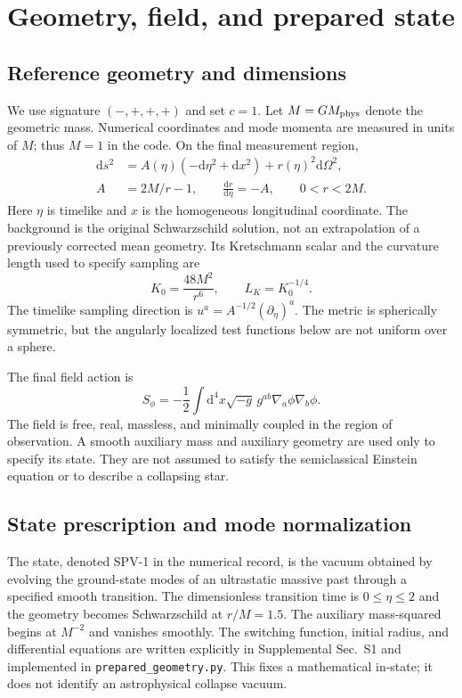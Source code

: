 \documentclass[aps,prd,reprint,floatfix,nofootinbib,longbibliography]{revtex4-2}
\newcommand{\dd}{\mathrm{d}}
\newcommand{\Lc}{L_{\!K}}
\begin{document}
\section{Geometry, field, and prepared state}
\subsection{Reference geometry and dimensions}
We use signature $(-,+,+,+)$ and set $c=1$. Let $M=G M_{\rm phys}$ denote the geometric mass. Numerical coordinates and mode momenta are measured in units of $M$; thus $M=1$ in the code. On the final measurement region,
\begin{align}
 \dd s^2&=A(\eta)(-\dd\eta^2+\dd x^2)+r(\eta)^2\dd\Omega^2,\label{eq:metric}\\
 A&=2M/r-1,\qquad \frac{\dd r}{\dd\eta}=-A,\qquad 0<r<2M.
\end{align}
Here $\eta$ is timelike and $x$ is the homogeneous longitudinal coordinate. The background is the original Schwarzschild solution, not an extrapolation of a previously corrected mean geometry. Its Kretschmann scalar and the curvature length used to specify sampling are
\begin{equation}
 K_0=\frac{48M^2}{r^6},\qquad \Lc=K_0^{-1/4}.
 \label{eq:curv}
\end{equation}
The timelike sampling direction is $u^a=A^{-1/2}(\partial_\eta)^a$. The metric is spherically symmetric, but the angularly localized test functions below are not uniform over a sphere.

The final field action is
\begin{equation}
 S_\phi=-\frac12\int\dd^4x\sqrt{-g}\,g^{ab}\nabla_a\phi\nabla_b\phi.
 \label{eq:action}
\end{equation}
The field is free, real, massless, and minimally coupled in the region of observation. A smooth auxiliary mass and auxiliary geometry are used only to specify its state. They are not assumed to satisfy the semiclassical Einstein equation or to describe a collapsing star.

\subsection{State prescription and mode normalization}
The state, denoted SPV-1 in the numerical record, is the vacuum obtained by evolving the ground-state modes of an ultrastatic massive past through a specified smooth transition. The dimensionless transition time is $0\leq\eta\leq2$ and the geometry becomes Schwarzschild at $r/M=1.5$. The auxiliary mass-squared begins at $M^{-2}$ and vanishes smoothly. The switching function, initial radius, and differential equations are written explicitly in Supplemental Sec.~S1 and implemented in \texttt{prepared\_geometry.py}. This fixes a mathematical in-state; it does not identify an astrophysical collapse vacuum.
\end{document}
